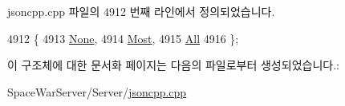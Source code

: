 jsoncpp.\+cpp 파일의 4912 번째 라인에서 정의되었습니다.


\begin{DoxyCode}
4912             \{
4913     \hyperlink{struct_json_1_1_comment_style_a51fc08f3518fd81eba12f340d19a3d0cac8b32a8bae63414c8647d4919da8d437}{None},  
4914     \hyperlink{struct_json_1_1_comment_style_a51fc08f3518fd81eba12f340d19a3d0cac65238f050773c107690a456e9c05c98}{Most},  
4915     \hyperlink{struct_json_1_1_comment_style_a51fc08f3518fd81eba12f340d19a3d0ca32302c0b97190c1808b3e38f367fef01}{All}  
4916   \};
\end{DoxyCode}


이 구조체에 대한 문서화 페이지는 다음의 파일로부터 생성되었습니다.\+:\begin{DoxyCompactItemize}
\item 
Space\+War\+Server/\+Server/\hyperlink{jsoncpp_8cpp}{jsoncpp.\+cpp}\end{DoxyCompactItemize}
